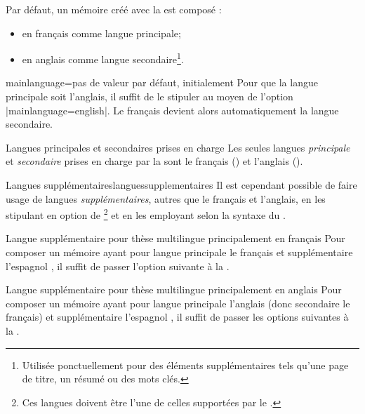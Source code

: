 Par défaut, un mémoire créé avec la \yatCl est composé :
\begin{itemize}
\item en français comme langue principale;
\item en anglais comme langue secondaire\footnote{Utilisée ponctuellement pour
    des éléments supplémentaires tels qu'une page de titre, un résumé ou des
    mots clés.}.
\end{itemize}
%
\begin{docKey}{mainlanguage}{=\textbar{}}{pas
    de valeur par défaut, initialement }
  Pour que la langue principale  soit l'anglais, il
  suffit de le stipuler au moyen de l'option |mainlanguage=english|. Le français
  devient alors automatiquement la langue secondaire.
\end{docKey}

\begin{dbwarning}{Langues principales et secondaires prises en charge}{}
  Les seules langues \emph{principale} et \emph{secondaire} prises en charge
  par la \yatCl sont le français () et l'anglais
  ().
\end{dbwarning}

\begin{dbremark}{Langues supplémentaires}{languessupplementaires}
  Il est cependant possible de faire usage de langues \emph{supplémentaires},
  autres que le français et l'anglais, en les stipulant en option de
  \footnote{Ces langues doivent être l'une de
    celles supportées par le .} et en les employant selon la
  syntaxe du .
\end{dbremark}

\begin{dbexample}{Langue supplémentaire pour thèse
    multilingue principalement en français}{}
  Pour composer un mémoire ayant pour langue principale le français et
  supplémentaire l'espagnol , il suffit de passer l'option suivante à la \yatCl{}.
\end{dbexample}

\begin{dbexample}{Langue supplémentaire pour thèse
    multilingue principalement en anglais}{}
  Pour composer un mémoire ayant pour langue principale l'anglais (donc
  secondaire le français) et supplémentaire l'espagnol , il suffit de passer les options
  suivantes à la \yatCl{}.
\end{dbexample}

